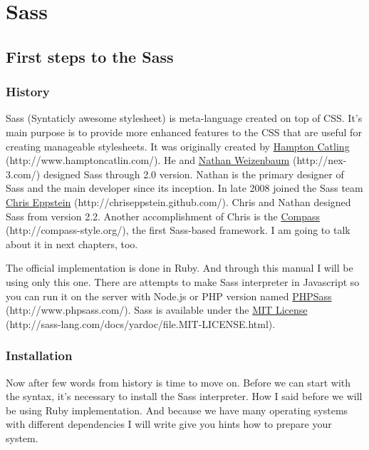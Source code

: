 \documentclass[a4paper,12pt,oneside]{sphinxmanual}
\begin{document}
\chapter{Sass}


\section{First steps to the Sass}
\label{src/sass:first-steps-to-the-sass}

\subsection{History}
\label{src/sass:history}
Sass (Syntaticly awesome stylesheet) is meta-language created on top of CSS. It's main purpose is to provide more enhanced features to the CSS that are useful for creating manageable stylesheets. It was originally created by \href{http://www.hamptoncatlin.com/}{Hampton Catling} (http://www.hamptoncatlin.com/). He and \href{http://nex-3.com/}{Nathan Weizenbaum} (http://nex-3.com/) designed Sass through 2.0 version. Nathan is the primary designer of Sass and the main developer since its inception. In late 2008 joined the Sass team \href{http://chriseppstein.github.com/}{Chris Eppstein} (http://chriseppstein.github.com/). Chris and Nathan designed Sass from version 2.2. Another accomplishment of Chris is the \href{http://compass-style.org/}{Compass} (http://compass-style.org/), the first Sass-based framework. I am going to talk about it in next chapters, too.

The official implementation is done in Ruby. And through this manual I will be using only this one. There are attempts to make Sass interpreter in Javascript so you can run it on the server with Node.js or PHP version named \href{http://www.phpsass.com/}{PHPSass} (http://www.phpsass.com/). Sass is available under the \href{http://sass-lang.com/docs/yardoc/file.MIT-LICENSE.html}{MIT License} (http://sass-lang.com/docs/yardoc/file.MIT-LICENSE.html).


\subsection{Installation}
\label{src/sass:installation}
Now after few words from history is time to move on. Before we can start with the syntax, it's necessary to install the Sass interpreter. How I said before we will be using Ruby implementation. And because we have many operating systems with different dependencies I will write give you hints how to prepare your system.
\end{document}
